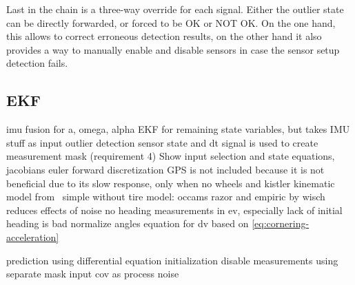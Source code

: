 Last in the chain is a three-way override for each signal. Either the outlier state can be directly forwarded, or forced to be OK or NOT OK. On the one hand, this allows to correct erroneous detection results, on the other hand it also provides a way to manually enable and disable sensors in case the sensor setup detection fails.

\subsection{EKF}
imu fusion for a, omega, alpha
EKF for remaining state variables, but takes IMU stuff as input
outlier detection sensor state and dt signal is used to create measurement mask (requirement 4)
Show input selection and state equations, jacobians
euler forward discretization
GPS is not included because it is not beneficial due to its slow response, only when no wheels and kistler
kinematic model from~\cite[p.~156]{AlexanderWischnewski.2019}
simple without tire model: occams razor and empiric by wisch
reduces effects of noise
no heading measurements in ev, especially lack of initial heading is bad
normalize angles
equation for dv based on \ref{eq:cornering-acceleration}

prediction using differential equation
initialization
disable measurements using separate mask
input cov as process noise
